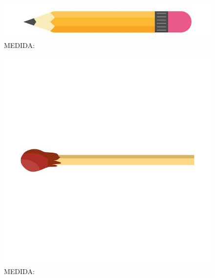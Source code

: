 %
\begin{figure}[htpb!]
\includegraphics[width=\textwidth]{media/image29.jpg}
\caption{MEDIDA:}
\end{figure}
%
\begin{figure}[htpb!]
\includegraphics[width=.5\textwidth]{media/image30.jpg}
\caption{MEDIDA:}
\end{figure}
%
